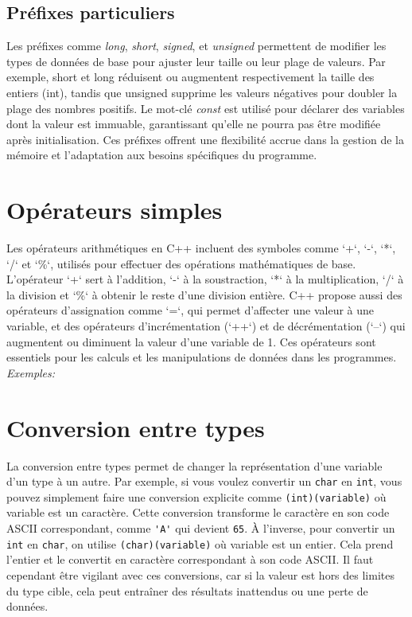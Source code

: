 


\subsection{Préfixes particuliers}
Les préfixes comme \emph{long}, \emph{short}, \emph{signed}, et \emph{unsigned} permettent de modifier les types de données de base pour ajuster leur taille ou leur plage de valeurs. Par exemple, short et long réduisent ou augmentent respectivement la taille des entiers (int), tandis que unsigned supprime les valeurs négatives pour doubler la plage des nombres positifs. Le mot-clé \emph{const} est utilisé pour déclarer des variables dont la valeur est immuable, garantissant qu’elle ne pourra pas être modifiée après initialisation. Ces préfixes offrent une flexibilité accrue dans la gestion de la mémoire et l’adaptation aux besoins spécifiques du programme.

\section{Opérateurs simples}
Les opérateurs arithmétiques en C++ incluent des symboles comme `+`, `-`, `*`, `/` et `\%`, utilisés pour effectuer des opérations mathématiques de base. L'opérateur `+` sert à l'addition, `-` à la soustraction, `*` à la multiplication, `/` à la division et `\%` à obtenir le reste d'une division entière. C++ propose aussi des opérateurs d'assignation comme `=`, qui permet d'affecter une valeur à une variable, et des opérateurs d'incrémentation (`++`) et de décrémentation (`--`) qui augmentent ou diminuent la valeur d'une variable de 1. Ces opérateurs sont essentiels pour les calculs et les manipulations de données dans les programmes. \emph{Exemples:}



\section{Conversion entre types}
La conversion entre types permet de changer la représentation d'une variable d’un type à un autre. Par exemple, si vous voulez convertir un \lstinline|char| en \lstinline|int|, vous pouvez simplement faire une conversion explicite comme \lstinline|(int)(variable)| où variable est un caractère. Cette conversion transforme le caractère en son code ASCII correspondant, comme \lstinline|'A'| qui devient \lstinline|65|. À l'inverse, pour convertir un \lstinline|int| en \lstinline|char|, on utilise \lstinline|(char)(variable)| où variable est un entier. Cela prend l'entier et le convertit en caractère correspondant à son code ASCII. Il faut cependant être vigilant avec ces conversions, car si la valeur est hors des limites du type cible, cela peut entraîner des résultats inattendus ou une perte de données.